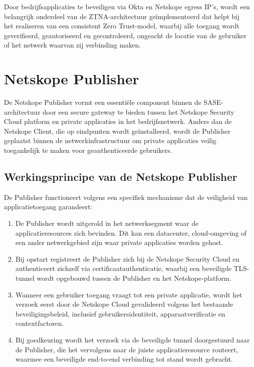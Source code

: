 Door bedrijfsapplicaties te beveiligen via Okta en Netskope egress IP's, wordt een belangrijk onderdeel van de ZTNA-architectuur geïmplementeerd dat helpt bij het realiseren van een consistent Zero Trust-model, waarbij alle toegang wordt geverifieerd, geautoriseerd en gecontroleerd, ongeacht de locatie van de gebruiker of het netwerk waarvan zij verbinding maken.

\section{Netskope Publisher}

De Netskope Publisher vormt een essentiële component binnen de SASE-architectuur door een secure gateway te bieden tussen het Netskope Security Cloud platform en private applicaties in het bedrijfsnetwerk. Anders dan de Netskope Client, die op eindpunten wordt geïnstalleerd, wordt de Publisher geplaatst binnen de netwerkinfrastructuur om private applicaties veilig toegankelijk te maken voor geauthenticeerde gebruikers.

\subsection{Werkingsprincipe van de Netskope Publisher}

De Publisher functioneert volgens een specifiek mechanisme dat de veiligheid van applicatietoegang garandeert:

\begin{enumerate}
    \item De Publisher wordt uitgerold in het netwerksegment waar de applicatieresources zich bevinden. Dit kan een datacenter, cloud-omgeving of een ander netwerkgebied zijn waar private applicaties worden gehost.

    \item Bij opstart registreert de Publisher zich bij de Netskope Security Cloud en authenticeert zichzelf via certificaatauthenticatie, waarbij een beveiligde TLS-tunnel wordt opgebouwd tussen de Publisher en het Netskope-platform.

    \item Wanneer een gebruiker toegang vraagt tot een private applicatie, wordt het verzoek eerst door de Netskope Cloud gevalideerd volgens het bestaande beveiligingsbeleid, inclusief gebruikersidentiteit, apparaatverificatie en contextfactoren.

    \item Bij goedkeuring wordt het verzoek via de beveiligde tunnel doorgestuurd naar de Publisher, die het vervolgens naar de juiste applicatieresource routeert, waarmee een beveiligde end-to-end verbinding tot stand wordt gebracht.
\end{enumerate}

